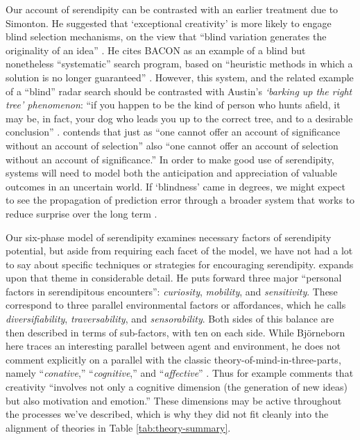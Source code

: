 Our account of serendipity can be contrasted with an earlier treatment due to Simonton.  
He suggested that `exceptional
creativity' is more likely to engage blind selection mechanisms, on
the view that ``blind variation generates the originality of an
idea'' \cite[p.~158]{simonton2010creative}.  He cites {\sf BACON} \cite{langley1987scientific} as an
example of a blind but nonetheless ``systematic'' search program,
based on ``heuristic methods in which a solution is no longer
guaranteed'' \cite[p.~169]{simonton2010creative}.  However, this
system, and the related example of a ``blind'' radar search
\cite[p.~383]{campbell1960blind} should be contrasted with Austin's
\emph{`barking up the right tree' phenomenon}: ``if you happen to be
the kind of person who hunts afield, it may be, in fact, your dog who
leads you up to the correct tree, and to a desirable conclusion''
\cite[p.~50]{austin1978chase}.
\citet[p.~720]{kockelman2011biosemiosis} contends that just as ``one
cannot offer an account of significance without an account of
selection'' also ``one cannot offer an account of selection without an
account of significance.''  In order to make good use of serendipity,
systems will need to model both the anticipation and appreciation of
valuable outcomes in an uncertain world.
If `blindness' came in degrees, we might expect to see the
propagation of prediction error through a broader system that works to
reduce surprise over the long term \cite{Kiverstein2017,Friston2012}.

Our six-phase model of serendipity examines necessary factors of serendipity
potential, but aside from requiring each facet of the model, we have
not had a lot to say about specific techniques or strategies for
encouraging serendipity.  \citet{bjorneborn2017three} expands upon
that theme in considerable detail.  He puts forward three major
``personal factors in serendipitous encounters'': \emph{curiosity},
\emph{mobility}, and \emph{sensitivity}.  These correspond to three
parallel environmental factors or affordances, which he calls
\emph{diversifiability}, \emph{traversability}, and
\emph{sensorability}.  Both sides of this balance are then described
in terms of sub-factors, with ten on each side.  While Bj\"orneborn
here traces an interesting parallel between agent and environment, he
does not comment explicitly on a parallel with the classic theory-of-mind-in-three-parts, namely ``\emph{conative},''
``\emph{cognitive},'' and ``\emph{affective}''
\cite{hilgard1980trilogy}.
Thus for example \citet[p.~347]{boden1998creativity} comments that
creativity ``involves not only a cognitive dimension (the generation
of new ideas) but also motivation and emotion.''
These dimensions may be active throughout the processes we've
described, which is why they did not fit cleanly into the alignment of
theories in Table \ref{tab:theory-summary}.

